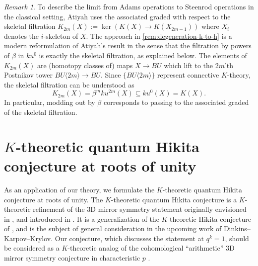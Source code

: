 \documentclass[reqno]{amsart}
\numberwithin{equation}{section}
\numberwithin{equation}{section}
\numberwithin{equation}{section}
\theoremstyle{definition}
\theoremstyle{remark}
\theoremstyle{remark}
\newtheorem{rem}[thm]{Remark}
\begin{document}



\begin{rem}\label{rem:degeneration-atiyah}
    To describe the limit from Adams operations to Steenrod operations in the classical setting, Atiyah \cite[Lemma 5.1, Proposition 5.6, Theorem 6.5]{atiyah-power} uses the associated graded with respect to the skeletal filtration $K_{2m}(X) := \ker \left( K(X) \to K(X_{2m-1}) \right)$ where $X_i$ denotes the $i$-skeleton of $X$. The approach in \cref{rem:degeneration-k-to-h} is a modern reformulation of Atiyah's result in the sense that the filtration by powers of $\beta$ in $ku^0$ is exactly the skeletal filtration, as explained below. The elements of $K_{2m}(X)$ are (homotopy classes of) maps $X \to BU$ which lift to the $2m$'th Postnikov tower $BU\langle 2m \rangle \to BU$. Since $\{ BU\langle 2m\rangle \}$ represent connective $K$-theory, the skeletal filtration can be understood as
    \begin{equation}
        K_{2m}(X) = \beta^m ku^{2m}(X) \subseteq ku^0(X) = K(X).
    \end{equation}
    In particular, modding out by $\beta$ corresponds to passing to the associated graded of the skeletal filtration.
\end{rem}




\section{$K$-theoretic quantum Hikita conjecture at roots of unity}\label{sec:quantumHikita}
As an application of our theory, we formulate the $K$-theoretic quantum Hikita conjecture at roots of unity. The $K$-theoretic quantum Hikita conjecture is a $K$-theoretic refinement of the 3D mirror symmetry statement originally envisioned in \cite[Remark 1.4]{KMP21}, and introduced in \cite{zhou2021virtual}. It is a generalization of the $K$-theoretic Hikita conjecture of \cite{dumanski-krylov}, and is the subject of general consideration in the upcoming work of Dinkins--Karpov--Krylov. Our conjecture, which discusses the statement at $q^k=1$, should be considered as a $K$-theoretic analog of the cohomological ``arithmetic'' 3D mirror symmetry conjecture in characteristic $p$ \cite{bai-lee}.
\end{document}
